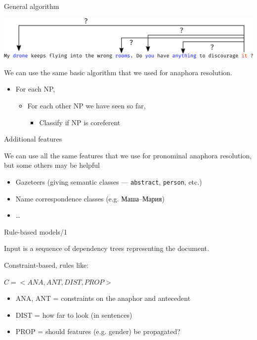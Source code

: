 \documentclass[dvipsnames, 10pt, compress]{beamer}
\begin{document}
\begin{frame}{General algorithm}

\includegraphics[width=\textwidth]{graphics/classifier-coref-2.eps}

We can use the same basic algorithm that we used for anaphora resolution.

\begin{itemize}
  \item For each NP,
  \begin{itemize}
     \item For each other NP we have seen so far,
     \begin{itemize}
       \item Classify if NP is coreferent
     \end{itemize}
  \end{itemize}
\end{itemize}

\end{frame}


\begin{frame}{Additional features}

We can use all the same features that we use for pronominal anaphora resolution, 
but some others may be helpful

\begin{itemize}
  \item Gazeteers (giving semantic classes --- {\tt abstract}, {\tt person}, etc.)
  \item Name correspondence classes (e.g. Маша--Мария)
  \item \ldots
\end{itemize}


\end{frame}


\begin{frame}{Rule-based models/1} %

Input is a sequence of dependency trees representing the document.

Constraint-based, rules like:

$C = <ANA,  ANT, DIST, PROP>$

\begin{itemize}
  \item ANA, ANT = constraints on the anaphor and antecedent
  \item DIST = how far to look (in sentences)
  \item PROP = should features (e.g. gender) be propagated?
\end{itemize}

\end{frame}
\end{document}

